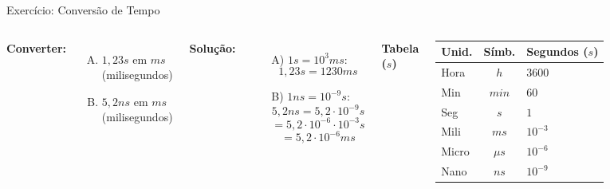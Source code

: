 \documentclass{beamer}
\begin{document}
	\begin{frame}{Exercício: Conversão de Tempo}
		\begin{columns}
			\textbf{Converter:}
			\begin{enumerate}[A)]
				\item $1,23 s$ em $ms$ (milisegundos)
				\item $5,2 ns$ em $ms$ (milisegundos)
			\end{enumerate}
			
			\pause
			\vspace{0.2cm}
			\textbf{Solução:}
			\begin{itemize}
				\item[A)] $1 s = 10^3 ms$:
				$$ 1,23 s = 1230 ms $$
				
				\item[B)] $1 ns = 10^{-9} s$:
				{\small
					$$ 5,2 ns = 5,2 \cdot 10^{-9} s $$
					$$ = 5,2 \cdot 10^{-6} \cdot 10^{-3} s $$
					$$ = 5,2 \cdot 10^{-6} ms $$
				}
			\end{itemize}
			
			\centering
			\textbf{Tabela ($s$)}
			
			\scriptsize %
			\begin{tabular}{|l|c|l|}
				\hline
				\textbf{Unid.} & \textbf{Símb.} & \textbf{Segundos ($s$)} \\ \hline
				Hora & $h$ & $3600$ \\ \hline
				Min & $min$ & $60$ \\ \hline
				Seg & $s$ & $1$ \\ \hline
				Mili & $ms$ & $10^{-3}$ \\ \hline
				Micro & $\mu s$ & $10^{-6}$ \\ \hline
				Nano & $ns$ & $10^{-9}$ \\ \hline
			\end{tabular}
		\end{columns}
	\end{frame}
	
\end{document}
